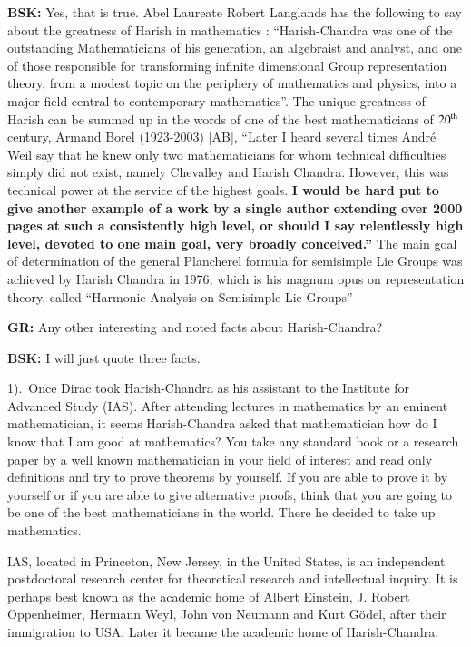 \textbf{BSK:} Yes, that is true.  Abel Laureate Robert Langlands has the following to say about the greatness of Harish in mathematics \cite{chap17-key07RPL} : “Harish-Chandra was one of the outstanding Mathematicians of his generation, an algebraist and analyst, and one of those responsible for transforming infinite dimensional Group representation theory, from a modest topic on the periphery of mathematics and physics, into a major field central to contemporary mathematics”. The unique greatness of Harish can be summed up in the words of one of the best mathematicians of $20^{\rm th}$ century, Armand Borel (1923-2003) [AB], “Later I heard several times André Weil say that he knew only two mathematicians for whom technical difficulties simply did not exist, namely Chevalley and Harish Chandra.  However, this was technical power at the service of the highest goals. \textbf{I would be hard put to give another example of a work by a single author extending over 2000 pages at such a consistently high level, or should I say relentlessly high level, devoted to one main goal, very broadly conceived.”}  The main goal of determination of the general Plancherel formula for semisimple Lie Groups was achieved by Harish Chandra in 1976, which is his magnum opus on representation theory, called “Harmonic Analysis on Semisimple Lie Groups” 

\textbf{GR:} Any other interesting and noted facts about Harish-Chandra?

\textbf{BSK:}  I will just quote three facts.

1).~Once Dirac took Harish-Chandra as his assistant to  the Institute for Advanced Study (IAS). After attending  lectures in mathematics by an eminent mathematician,  it seems Harish-Chandra asked that mathematician how do I know that I am good at mathematics? You take any standard book or a research paper by a well known mathematician in your field of interest and read only definitions and try to prove theorems by yourself. If you are able to prove it by yourself or if you are able to give alternative proofs, think that you are going to be one of the best mathematicians in the world. There he decided to take up mathematics.

IAS, located in Princeton, New Jersey, in the United States, is an independent postdoctoral research center for theoretical research and intellectual inquiry. It is perhaps best known as the academic home of Albert Einstein, J. Robert Oppenheimer, Hermann Weyl, John von Neumann and Kurt Gödel, after their immigration to USA. {\small Later it became the academic home of Harish-Chandra.}

